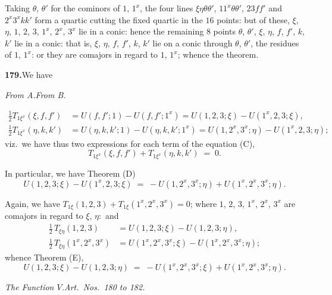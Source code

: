 \documentclass[11pt]{article}
\begin{document}
Taking $\theta$, $\theta'$ for the cominors of $1$, $1^{x}$, the four lines $\xi\eta\theta\theta'$, $11^{x}\theta\theta'$, $23ff'$ and
$2^{x}3^{x}k k'$ form a quartic cutting the fixed quartic in the $16$ points: but of these,
$\xi$, $\eta$, $1$, $2$, $3$, $1^{x}$, $2^{x}$, $3^{x}$ lie in a conic: hence the remaining $8$ points $\theta$, $\theta'$, $\xi$, $\eta$,
$f$, $f'$, $k$, $k'$ lie in a conic: that is, $\xi$, $\eta$, $f$, $f'$, $k$, $k'$ lie on a conic through $\theta$, $\theta'$, the
residues of $1$, $1^{x}$: or they are comajors in regard to $1$, $1^{x}$; whence the theorem.

\medskip
\textbf{179.}\quad We have
\begin{center}
\textit{From A.}\hfill\textit{From B.}
\end{center}
\vspace{-1em}
\begin{align*}
\tfrac{1}{2}T_{1\xi^{x}}(\xi,f,f') &= U(f,f';1) - U(f,f';1^{x}) = U(1,2,3;\xi) - U(1^{x},2,3;\xi),\\
\tfrac{1}{2}T_{1\xi^{x}}(\eta,k,k') &= U(\eta,k,k';1) - U(\eta,k,k';1^{x}) = U(1,2^{x},3^{x};\eta) - U(1^{x},2,3;\eta);
\end{align*}
viz.\ we have thus two expressions for each term of the equation (C),
\[
T_{1\xi^{x}}(\xi,f,f') + T_{1\xi^{x}}(\eta,k,k') \;=\; 0.
\]

In particular, we have Theorem (D)
\begin{equation*}
U(1,2,3;\xi) - U(1^{x},2,3;\xi) \;=\; -U(1,2^{x},3^{x};\eta) + U(1^{x},2^{x},3^{x};\eta). \tag{D}
\end{equation*}

Again, we have $T_{1\xi}(1,2,3) + T_{1\xi}(1^{x},2^{x},3^{x}) = 0$; where $1$, $2$, $3$, $1^{x}$, $2^{x}$, $3^{x}$ are
comajors in regard to $\xi$, $\eta$:\ and
\begin{align*}
\tfrac{1}{2}\,T_{\xi\eta}(1,2,3)            &= U(1,2,3;\xi)-U(1,2,3;\eta),\\
\tfrac{1}{2}\,T_{\xi\eta}(1^{x},2^{x},3^{x}) &= U(1^{x},2^{x},3^{x};\xi)-U(1^{x},2^{x},3^{x};\eta);
\end{align*}
whence Theorem (E),
\begin{equation*}
U(1,2,3;\xi) - U(1,2,3;\eta) \;=\; -U(1^{x},2^{x},3^{x};\xi) + U(1^{x},2^{x},3^{x};\eta).\tag{E}
\end{equation*}

\bigskip
\begin{center}\textit{The Function $V$.\quad Art.\ Nos.\ 180 to 182.}\end{center}
\end{document}
